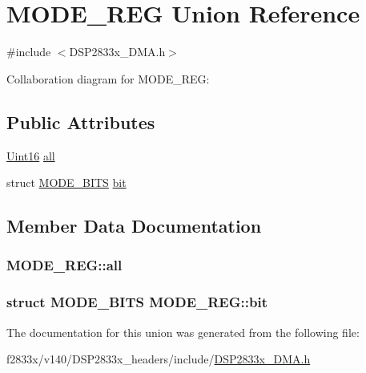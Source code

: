 \hypertarget{union_m_o_d_e___r_e_g}{}\section{M\+O\+D\+E\+\_\+\+R\+E\+G Union Reference}
\label{union_m_o_d_e___r_e_g}


{\ttfamily \#include $<$D\+S\+P2833x\+\_\+\+D\+M\+A.\+h$>$}



Collaboration diagram for M\+O\+D\+E\+\_\+\+R\+E\+G\+:
\subsection*{Public Attributes}
\begin{DoxyCompactItemize}
\item 
\hyperlink{_d_s_p2833x___device_8h_a59a9f6be4562c327cbfb4f7e8e18f08b}{Uint16} \hyperlink{union_m_o_d_e___r_e_g_ad53c4bf6c415d09a298c80c1128e103b}{all}
\item 
struct \hyperlink{struct_m_o_d_e___b_i_t_s}{M\+O\+D\+E\+\_\+\+B\+I\+T\+S} \hyperlink{union_m_o_d_e___r_e_g_a8fbb6e6d95ca04b4ffbaedea58748d51}{bit}
\end{DoxyCompactItemize}


\subsection{Member Data Documentation}
\hypertarget{union_m_o_d_e___r_e_g_ad53c4bf6c415d09a298c80c1128e103b}{}
\subsubsection[{all}]{ M\+O\+D\+E\+\_\+\+R\+E\+G\+::all}\label{union_m_o_d_e___r_e_g_ad53c4bf6c415d09a298c80c1128e103b}
\hypertarget{union_m_o_d_e___r_e_g_a8fbb6e6d95ca04b4ffbaedea58748d51}{}
\subsubsection[{bit}]{\setlength{\rightskip}{0pt plus 5cm}struct {\bf M\+O\+D\+E\+\_\+\+B\+I\+T\+S} M\+O\+D\+E\+\_\+\+R\+E\+G\+::bit}\label{union_m_o_d_e___r_e_g_a8fbb6e6d95ca04b4ffbaedea58748d51}


The documentation for this union was generated from the following file\+:\begin{DoxyCompactItemize}
\item 
f2833x/v140/\+D\+S\+P2833x\+\_\+headers/include/\hyperlink{_d_s_p2833x___d_m_a_8h}{D\+S\+P2833x\+\_\+\+D\+M\+A.\+h}\end{DoxyCompactItemize}
